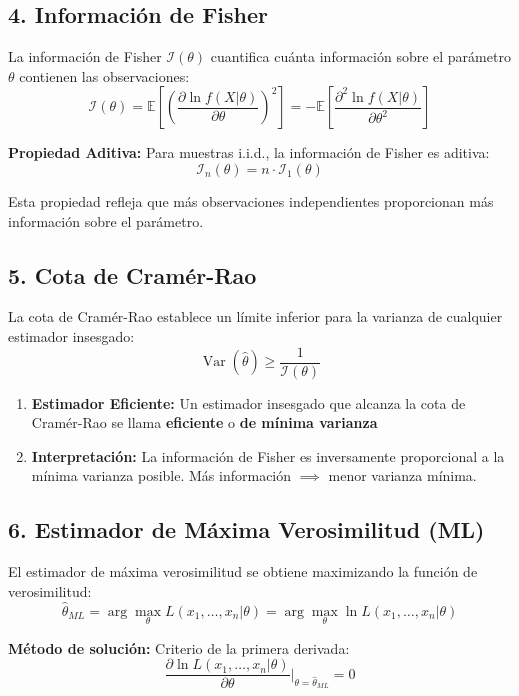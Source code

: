 \documentclass[
  11pt,
  letterpaper,
   addpoints,
   answers
  ]{exam}
\DeclareMathOperator{\Var}{Var} %
\begin{document}
\subsection*{4. Información de Fisher}

La información de Fisher $\mathcal{I}(\theta)$ cuantifica cuánta información sobre el parámetro $\theta$ contienen las observaciones:
\[
\mathcal{I}(\theta) = \mathbb{E}\left[\left(\frac{\partial \ln f(X|\theta)}{\partial \theta}\right)^2\right] = -\mathbb{E}\left[\frac{\partial^2 \ln f(X|\theta)}{\partial \theta^2}\right]
\]

\textbf{Propiedad Aditiva:} Para muestras i.i.d., la información de Fisher es aditiva:
\[
\mathcal{I}_n(\theta) = n \cdot \mathcal{I}_1(\theta)
\]

Esta propiedad refleja que más observaciones independientes proporcionan más información sobre el parámetro.

\subsection*{5. Cota de Cramér-Rao}

La cota de Cramér-Rao establece un límite inferior para la varianza de cualquier estimador insesgado:
\[
\Var(\hat{\theta}) \geq \frac{1}{\mathcal{I}(\theta)}
\]
\begin{enumerate}
  \item \textbf{Estimador Eficiente:} Un estimador insesgado que alcanza la cota de Cramér-Rao se llama \textbf{eficiente} o \textbf{de mínima varianza}

\item \textbf{Interpretación:} La información de Fisher es inversamente proporcional a la mínima varianza posible. Más información $\implies$ menor varianza mínima.
\end{enumerate}
\subsection*{6. Estimador de Máxima Verosimilitud (ML)}

El estimador de máxima verosimilitud se obtiene maximizando la función de verosimilitud:
\[
\hat{\theta}_{ML} = \arg\max_{\theta} L(x_1, \ldots, x_n|\theta) = \arg\max_{\theta} \ln L(x_1, \ldots, x_n|\theta)
\]

\textbf{Método de solución:} Criterio de la primera derivada:
\[
\frac{\partial \ln L(x_1, \ldots, x_n|\theta)}{\partial \theta}\bigg|_{\theta=\hat{\theta}_{ML}} = 0
\]
\end{document}
